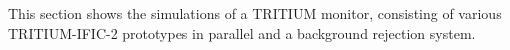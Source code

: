 This section shows the simulations of a TRITIUM monitor, consisting of various TRITIUM-IFIC-2 prototypes in parallel and a background rejection system.